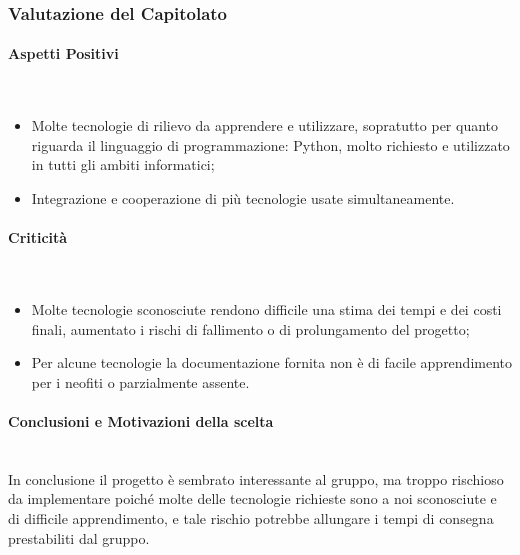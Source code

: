\subsubsection{Valutazione del Capitolato}

\paragraph{Aspetti Positivi} ~\\
\begin{itemize}
	\item Molte tecnologie di rilievo da apprendere e utilizzare, sopratutto per quanto riguarda il linguaggio di programmazione: Python, molto richiesto e utilizzato in tutti gli ambiti informatici;
	\item Integrazione e cooperazione di più tecnologie usate simultaneamente. 
\end{itemize}

\paragraph{Criticità} ~\\
\begin{itemize}
	\item Molte tecnologie sconosciute rendono difficile una stima dei tempi e dei costi finali, aumentato i rischi di fallimento o di prolungamento del progetto; 
	\item Per alcune tecnologie la documentazione fornita non è di facile apprendimento per i neofiti o parzialmente assente. 
\end{itemize}


\paragraph{Conclusioni e Motivazioni della scelta} ~\\
In conclusione il progetto è sembrato interessante al gruppo, ma troppo rischioso da implementare poiché molte delle tecnologie richieste sono a noi sconosciute e di difficile apprendimento, 
e tale rischio potrebbe allungare i tempi di consegna prestabiliti dal gruppo.  

